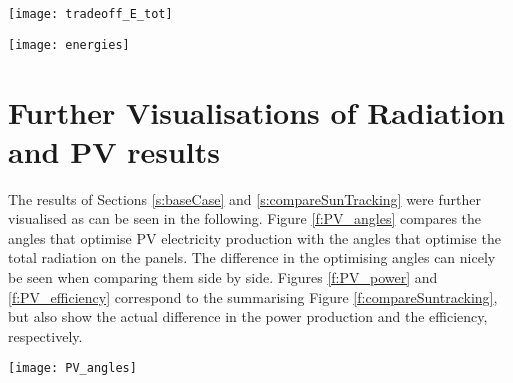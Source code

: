 	\begin{figure*}
		\begin{center}
		\texttt{[image: tradeoff\_E\_tot]}
		\caption{Influence of optimisation strategy on net energy demand including PV electricity production. Top: Net energy demand in dependence of optimisation strategy. Bottom: Corresponding difference to overall optimisation.}
		\label{f:tradeoff_E_tot}
		\end{center}
	\end{figure*}
	
	
	\begin{figure*}
		\begin{center}
		\texttt{[image: energies]}
		\caption{Energy demand distribution at overall optimization.}
		\label{f:energies}
		\end{center}
	\end{figure*}

	\cleardoublepage

\section{Further Visualisations of Radiation and PV results}
\label{a:PV}

	The results of Sections \ref{s:baseCase} and \ref{s:compareSunTracking} were further visualised as can be seen in the following. Figure \ref{f:PV_angles} compares the angles that optimise PV electricity production with the angles that optimise the total radiation on the panels. The difference in the optimising angles can nicely be seen when comparing them side by side. Figures \ref{f:PV_power} and \ref{f:PV_efficiency} correspond to the summarising Figure \ref{f:compareSuntracking}, but also show the actual difference in the power production and the efficiency, respectively. 

	\begin{figure*}[hb]
		\begin{center}
		\texttt{[image: PV\_angles]}
		\caption{Angle visulisations, that optimise the altitude (top) and azimuth (bottom) angles for radiation (left) and PV electricity production (right). While the Radiation optimisation yields a symmetric pattern, the PV electricity optimisation deviates from the pattern that optimises the radiation in order to minimise longitudinal shading on the panels.}
		\label{f:PV_angles}
		\end{center}
	\end{figure*}

